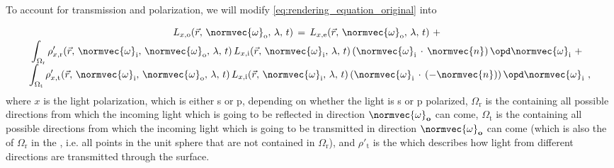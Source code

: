 To account for transmission and polarization, we will modify \eqref{eq:rendering_equation_original} into
%
\begin{equation} \label{eq:rendering_equation_improved}
\renewcommand*{\arraystretch}{1.5}
\begin{array}{cl}
L_{x,\text{o}}(\vec{r},\,\normvec{\omega}_{\text{o}},\, \lambda,\, t) \,=\, L_{x,\text{e}}(\vec{r},\, \normvec{\omega}_{\text{o}},\, \lambda,\, t) \ + \\
\displaystyle \int_{\Omega_{\text{r}}} \rho'_{x,\text{r}}(\vec{r},\, \normvec{\omega}_{\text{i}},\, \normvec{\omega}_{\text{o}},\, \lambda,\, t)\, L_{x,\text{i}}(\vec{r},\, \normvec{\omega}_{\text{i}},\, \lambda,\, t)\, (\normvec{\omega}_{\text{i}}\,\cdot\,\normvec{n})\, \opd \normvec{\omega}_{\text{i}} \ + \\
\displaystyle \int_{\Omega_{\text{t}}} \rho'_{x,\text{t}}(\vec{r},\, \normvec{\omega}_{\text{i}},\, \normvec{\omega}_{\text{o}},\, \lambda,\, t)\, L_{x,\text{i}}(\vec{r},\, \normvec{\omega}_{\text{i}},\, \lambda,\, t)\, (\normvec{\omega}_{\text{i}}\,\cdot\,(-\normvec{n}))\, \opd \normvec{\omega}_{\text{i}} & \!\!\!\! ,
\end{array}
\end{equation}
%
where $x$ is the light polarization, which is either s or p, depending on whether the light is s or p polarized, $\Omega_{\text{r}}$ is the  containing all possible directions from which the incoming light which is going to be reflected in direction $\normvec{\omega}_{\textbf{o}}$ can come, $\Omega_{\text{t}}$ is the  containing all possible directions from which the incoming light which is going to be transmitted in direction $\normvec{\omega}_{\textbf{o}}$ can come (which is also the  of $\Omega_{\text{r}}$ in the , i.e. all points in the unit sphere that are not contained in $\Omega_{\text{r}}$), and $\rho'_{\text{t}}$ is the \BTDF which describes how light from different directions are transmitted through the surface.

